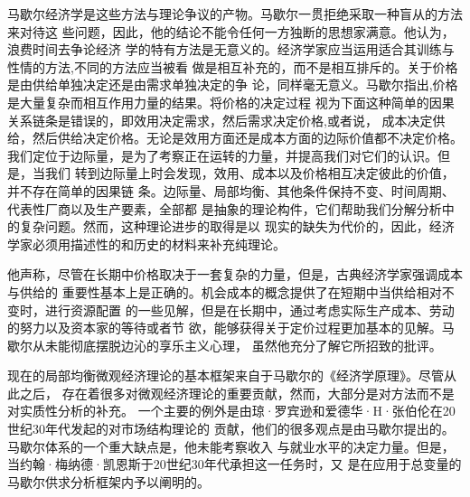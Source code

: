 马歇尔经济学是这些方法与理论争议的产物。马歇尔一贯拒绝采取一种盲从的方法来对待这
些问题，因此，他的结论不能令任何一方独断的思想家满意。他认为，浪费时间去争论经济
学的特有方法是无意义的。经济学家应当运用适合其训练与性情的方法,不同的方法应当被看
做是相互补充的，而不是相互排斥的。关于价格是由供给单独决定还是由需求单独决定的争
论，同样毫无意义。马歇尔指出,价格是大量复杂而相互作用力量的结果。将价格的决定过程
视为下面这种简单的因果关系链条是错误的，即效用决定需求，然后需求决定价格,或者说，
成本决定供给，然后供给决定价格。无论是效用方面还是成本方面的边际价值都不决定价格。
我们定位于边际量，是为了考察正在运转的力量，并提高我们对它们的认识。但是，当我们
转到边际量上时会发现，效用、成本以及价格相互决定彼此的价值，并不存在简单的因果链
条。边际量、局部均衡、其他条件保持不变、时间周期、代表性厂商以及生产要素，全部都
是抽象的理论构件，它们帮助我们分解分析中的复杂问题。然而，这种理论进步的取得是以
现实的缺失为代价的，因此，经济学家必须用描述性的和历史的材料来补充纯理论。

他声称，尽管在长期中价格取决于一套复杂的力量，但是，古典经济学家强调成本与供给的
重要性基本上是正确的。机会成本的概念提供了在短期中当供给相对不变时，进行资源配置
的一些见解，但是在长期中，通过考虑实际生产成本、劳动的努力以及资本家的等待或者节
欲，能够获得关于定价过程更加基本的见解。马歇尔从未能彻底摆脱边沁的享乐主义心理，
虽然他充分了解它所招致的批评。

现在的局部均衡微观经济理论的基本框架来自于马歇尔的《经济学原理》。尽管从此之后，
存在着很多对微观经济理论的重要贡献，然而，大部分是对方法而不是对实质性分析的补充。
一个主要的例外是由琼·罗宾逊和爱德华·H·张伯伦在20世纪30年代发起的对市场结构理论的
贡献，他们的很多观点是由马歇尔提出的。马歇尔体系的一个重大缺点是，他未能考察收入
与就业水平的决定力量。但是，当约翰·梅纳德·凯恩斯于20世纪30年代承担这一任务时，又
是在应用于总变量的马歇尔供求分析框架内予以阐明的。



